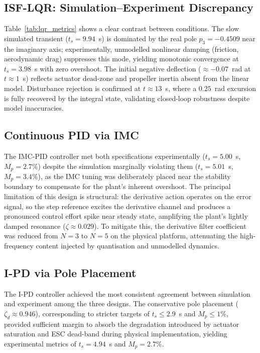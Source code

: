 \documentclass[conference]{IEEEtran}
\begin{document}
\subsection{ISF-LQR: Simulation--Experiment Discrepancy}
Table~\ref{tab:lqr_metrics} shows a clear contrast between conditions. The slow simulated transient ($t_s = 9.94$~s) is dominated by the real pole $p_3 = -0.4509$ near the imaginary axis; experimentally, unmodelled nonlinear damping (friction, aerodynamic drag) suppresses this mode, yielding monotonic convergence at $t_s = 3.98$~s with zero overshoot. The initial negative deflection (${\approx}-0.07$~rad at $t \approx 1$~s) reflects actuator dead-zone and propeller inertia absent from the linear model. Disturbance rejection is confirmed at $t \approx 13$~s, where a $0.25$~rad excursion is fully recovered by the integral state, validating closed-loop robustness despite model inaccuracies.

\subsection{Continuous PID via IMC}
The IMC-PID controller met both specifications experimentally 
($t_s = 5.00$~s, $M_p = 2.7\%$) despite the simulation marginally 
violating them ($t_s = 5.01$~s, $M_p = 3.4\%$), as the IMC tuning 
was deliberately placed near the stability boundary to compensate 
for the plant's inherent overshoot. The principal limitation of 
this design is structural: the derivative action operates on the 
error signal, so the step reference excites the derivative channel 
and produces a pronounced control effort spike near steady state, 
amplifying the plant's lightly damped resonance ($\zeta \approx 0.029$). 
To mitigate this, the derivative filter coefficient was reduced from 
$N = 3$ to $N = 5$ on the physical platform, attenuating the 
high-frequency content injected by quantisation and unmodelled 
dynamics. 


\subsection{I-PD via Pole Placement}
The I-PD controller achieved the most consistent agreement between simulation and experiment among the three designs. The conservative pole placement ($\zeta_d \approx 0.946$), corresponding to stricter targets of $t_s \leq 2.9$~s and $M_p \leq 1\%$, provided sufficient margin to absorb the degradation introduced by actuator saturation and ESC dead-band
during physical implementation, yielding experimental metrics of $t_s = 4.94$~s and $M_p = 2.7\%$. 
\end{document}
